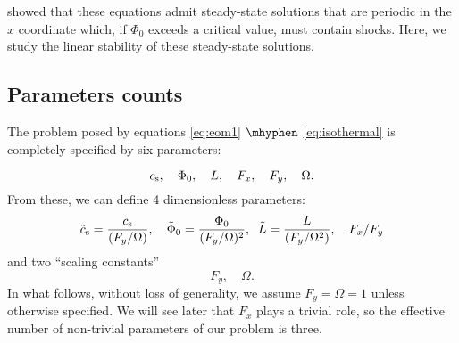 \documentclass[useAMS,usenatbib]{mn2e}
\begin{document}
\cite{Roberts1969} \citep[see also][]{Shu+1973} showed that these equations admit steady-state solutions that are periodic in the $x$ coordinate which, if $\Phi_0$ exceeds a critical value, must contain shocks. Here, we study the linear stability of these steady-state solutions.

\subsection{Parameters counts} \label{sec:parameterscounts}

The problem posed by equations \eqref{eq:eom1} $\mhyphen$ \eqref{eq:isothermal} is completely specified by six parameters: 

\begin{equation}
c_{\rm s}, \quad \Phi_0, \quad L, \quad F_x, \quad F_y, \quad \Omega.
\end{equation} 
%
From these, we can define 4 dimensionless parameters:
%
\begin{equation} \label{eq:dimensionlessparameters}
\tilde{c}_{\rm s} = \frac{c_{\rm s}}{(F_y/\Omega)},\quad \tilde{\Phi}_0 = \frac{\Phi_0}{(F_y/\Omega)^2}, \;\; \tilde{L} = \frac{L}{(F_y/\Omega^2)}, \quad F_x/F_y
\end{equation}
%
and two ``scaling constants'' 
%
\begin{equation}
F_y, \quad \Omega.
\end{equation}
In what follows, without loss of generality, we assume $F_y=\Omega=1$ unless otherwise specified. We will see later that $F_x$ plays a trivial role, so the effective number of non-trivial parameters of our problem is three.
\end{document}
